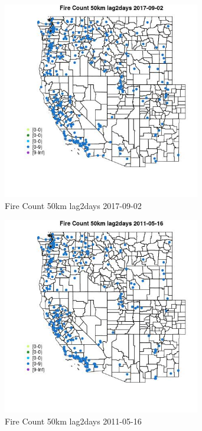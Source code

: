 \begin{figure} 
\centering  
\includegraphics[width=0.77\textwidth]{Code_Outputs/Report_ML_input_PM25_Step4_part_e_de_duplicated_aves_compiled_2019-05-21wNAs_MapObsFire_Count_50km_lag2days2017-09-02.jpg} 
\caption{\label{fig:Report_ML_input_PM25_Step4_part_e_de_duplicated_aves_compiled_2019-05-21wNAsMapObsFire_Count_50km_lag2days2017-09-02}Fire Count 50km lag2days 2017-09-02} 
\end{figure} 
 

\begin{figure} 
\centering  
\includegraphics[width=0.77\textwidth]{Code_Outputs/Report_ML_input_PM25_Step4_part_e_de_duplicated_aves_compiled_2019-05-21wNAs_MapObsFire_Count_50km_lag2days2011-05-16.jpg} 
\caption{\label{fig:Report_ML_input_PM25_Step4_part_e_de_duplicated_aves_compiled_2019-05-21wNAsMapObsFire_Count_50km_lag2days2011-05-16}Fire Count 50km lag2days 2011-05-16} 
\end{figure} 
 

